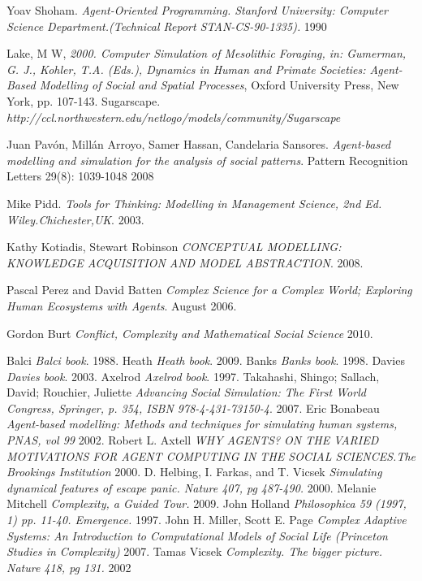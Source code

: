 \documentclass[11pt,oneside,a4paper,openright]{report}
\begin{document}
\begin{thebibliography}{13}
	Yoav Shoham.
	\emph{Agent-Oriented Programming. Stanford University: Computer Science Department.(Technical Report STAN-CS-90-1335).}
	1990 

	Lake, M W,
	\emph{2000. Computer Simulation of Mesolithic Foraging, in: Gumerman, G. J., Kohler, T.A. (Eds.), Dynamics in Human and Primate Societies: Agent-Based Modelling of Social and Spatial Processes}, Oxford University Press, New York, pp. 107-143.
	Sugarscape.
	\emph{http://ccl.northwestern.edu/netlogo/models/community/Sugarscape}

	Juan Pavón, Millán Arroyo, Samer Hassan, Candelaria Sansores.
	\emph{Agent-based modelling and simulation for the analysis of social patterns}. Pattern Recognition Letters 29(8): 1039-1048 
	2008

	Mike Pidd.
	\emph{Tools for Thinking: Modelling in Management Science, 2nd Ed. Wiley.Chichester,UK}.
	2003.

	Kathy Kotiadis, Stewart Robinson
	\emph{CONCEPTUAL MODELLING: KNOWLEDGE ACQUISITION AND MODEL ABSTRACTION}.
	2008.

	Pascal Perez and David Batten
	\emph{Complex Science for a Complex World; Exploring Human Ecosystems with Agents}. 
	August 2006.

	Gordon Burt
	\emph{Conflict, Complexity and Mathematical Social Science}
	2010.

	Balci
	\emph{Balci book}.
	1988.
	Heath
	\emph{Heath book}.
	2009.
	Banks
	\emph{Banks book}.
	1998.
	Davies
	\emph{Davies book}.
	2003.
	Axelrod
	\emph{Axelrod book}.
	1997.
	Takahashi, Shingo; Sallach, David; Rouchier, Juliette
	\emph{Advancing Social Simulation: The First World Congress, Springer, p. 354, ISBN 978-4-431-73150-4}.
	2007.
	Eric Bonabeau
	\emph{Agent-based modelling: Methods and techniques for simulating human systems, PNAS, vol 99} 
	2002.
	Robert L. Axtell
	\emph{WHY AGENTS? ON THE VARIED MOTIVATIONS FOR AGENT COMPUTING IN THE SOCIAL SCIENCES.The Brookings Institution}
	2000.
	D. Helbing, I. Farkas, and T. Vicsek 
	\emph{Simulating dynamical features of escape panic. Nature 407, pg 487-490.}
	2000.
	Melanie Mitchell
	\emph{Complexity, a Guided Tour.}
	2009.
	John Holland
	\emph{Philosophica 59 (1997, 1) pp. 11-40. Emergence.}
	1997.
	John H. Miller, Scott E. Page
	\emph{Complex Adaptive Systems: An Introduction to Computational Models of Social Life (Princeton Studies in Complexity)}
	2007.
	Tamas Vicsek
	\emph{Complexity. The bigger picture. Nature 418, pg 131.}
	2002	


\end{thebibliography}
\end{document}
